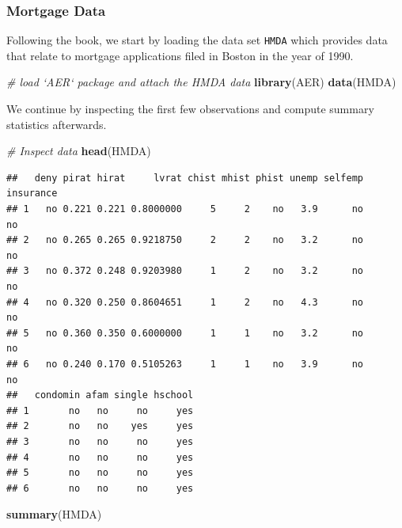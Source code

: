 \documentclass[]{book}
\newenvironment{Shaded}{\begin{snugshade}}{\end{snugshade}}
\newcommand{\KeywordTok}[1]{\textcolor[rgb]{0.13,0.29,0.53}{\textbf{#1}}}
\newcommand{\CommentTok}[1]{\textcolor[rgb]{0.56,0.35,0.01}{\textit{#1}}}
\newcommand{\NormalTok}[1]{#1}
\theoremstyle{definition}
\theoremstyle{definition}
\theoremstyle{definition}
\theoremstyle{remark}
\begin{document}
\subsubsection*{Mortgage Data}\label{mortgage-data}

Following the book, we start by loading the data set \texttt{HMDA} which
provides data that relate to mortgage applications filed in Boston in
the year of 1990.

\begin{Shaded}
\begin{Highlighting}[]
\CommentTok{# load `AER` package and attach the HMDA data}
\KeywordTok{library}\NormalTok{(AER)}
\KeywordTok{data}\NormalTok{(HMDA)}
\end{Highlighting}
\end{Shaded}

We continue by inspecting the first few observations and compute summary
statistics afterwards.

\begin{Shaded}
\begin{Highlighting}[]
\CommentTok{# Inspect data}
\KeywordTok{head}\NormalTok{(HMDA)}
\end{Highlighting}
\end{Shaded}

\begin{verbatim}
##   deny pirat hirat     lvrat chist mhist phist unemp selfemp insurance
## 1   no 0.221 0.221 0.8000000     5     2    no   3.9      no        no
## 2   no 0.265 0.265 0.9218750     2     2    no   3.2      no        no
## 3   no 0.372 0.248 0.9203980     1     2    no   3.2      no        no
## 4   no 0.320 0.250 0.8604651     1     2    no   4.3      no        no
## 5   no 0.360 0.350 0.6000000     1     1    no   3.2      no        no
## 6   no 0.240 0.170 0.5105263     1     1    no   3.9      no        no
##   condomin afam single hschool
## 1       no   no     no     yes
## 2       no   no    yes     yes
## 3       no   no     no     yes
## 4       no   no     no     yes
## 5       no   no     no     yes
## 6       no   no     no     yes
\end{verbatim}

\begin{Shaded}
\begin{Highlighting}[]
\KeywordTok{summary}\NormalTok{(HMDA)}
\end{Highlighting}
\end{Shaded}
\end{document}
